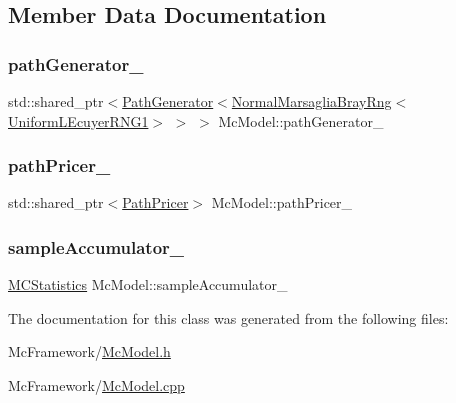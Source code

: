 \subsection{Member Data Documentation}
\hypertarget{class_mc_model_a169810bfa106409ed8bcdba1a5097997}{}\label{class_mc_model_a169810bfa106409ed8bcdba1a5097997} 
\subsubsection{\texorpdfstring{path\+Generator\+\_\+}{pathGenerator\_}}
{\footnotesize\ttfamily std\+::shared\+\_\+ptr$<$\hyperlink{class_path_generator}{Path\+Generator}$<$\hyperlink{class_normal_marsaglia_bray_rng}{Normal\+Marsaglia\+Bray\+Rng}$<$\hyperlink{class_uniform_l_ecuyer_r_n_g1}{Uniform\+L\+Ecuyer\+R\+N\+G1}$>$ $>$ $>$ Mc\+Model\+::path\+Generator\+\_\+\hspace{0.3cm}{\ttfamily [private]}}

\hypertarget{class_mc_model_a8b4390b3abdd1ffdd121a09f141299f9}{}\label{class_mc_model_a8b4390b3abdd1ffdd121a09f141299f9} 
\subsubsection{\texorpdfstring{path\+Pricer\+\_\+}{pathPricer\_}}
{\footnotesize\ttfamily std\+::shared\+\_\+ptr$<$\hyperlink{class_path_pricer}{Path\+Pricer}$>$ Mc\+Model\+::path\+Pricer\+\_\+\hspace{0.3cm}{\ttfamily [private]}}

\hypertarget{class_mc_model_aec19a3ee01c95751a50360d264d51def}{}\label{class_mc_model_aec19a3ee01c95751a50360d264d51def} 
\subsubsection{\texorpdfstring{sample\+Accumulator\+\_\+}{sampleAccumulator\_}}
{\footnotesize\ttfamily \hyperlink{class_m_c_statistics}{M\+C\+Statistics} Mc\+Model\+::sample\+Accumulator\+\_\+\hspace{0.3cm}{\ttfamily [private]}}



The documentation for this class was generated from the following files\+:\begin{DoxyCompactItemize}
\item 
Mc\+Framework/\hyperlink{_mc_model_8h}{Mc\+Model.\+h}\item 
Mc\+Framework/\hyperlink{_mc_model_8cpp}{Mc\+Model.\+cpp}\end{DoxyCompactItemize}

